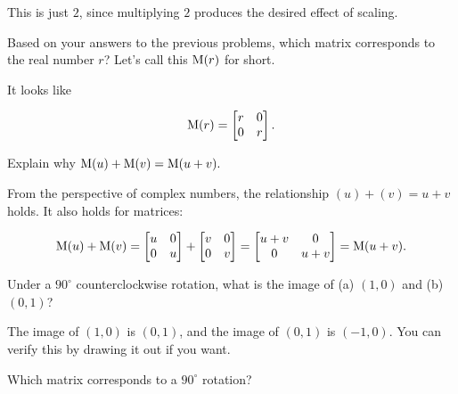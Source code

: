 \documentclass[../gatm_answers.tex]{subfiles}
\begin{document}
This is just $2$, since multiplying $2$ produces the desired effect of scaling.

\begin{outer_problem}
\item Based on your answers to the previous problems, which matrix corresponds to the real number $r$? Let's call this $\operatorname{M} (r)$ for short.
\end{outer_problem}

It looks like

$$\operatorname{M} (r) = \begin{bmatrix} r & 0 \\ 0 & r \end{bmatrix}.$$

\begin{outer_problem}
\item Explain why $\operatorname{M} (u)+\operatorname{M}(v)=\operatorname{M}(u+v).$
\end{outer_problem}

From the perspective of complex numbers, the relationship $(u)+(v)=u+v$ holds. It also holds for matrices:

$$\operatorname{M}(u) + \operatorname{M}(v) = \begin{bmatrix} u & 0 \\ 0 & u \end{bmatrix} + \begin{bmatrix} v & 0 \\ 0 & v \end{bmatrix} = \begin{bmatrix} u+v & 0 \\ 0 & u+v \end{bmatrix} = \operatorname{M}(u+v).$$

\begin{outer_problem}
\item Under a $90^\circ$ counterclockwise rotation, what is the image of (a) $(1,0)$ and (b) $(0,1)$?
\end{outer_problem}

The image of $(1,0)$ is $(0,1)$, and the image of $(0,1)$ is $(-1,0)$. You can verify this by drawing it out if you want.

\begin{outer_problem}
\item \label{prob:pr_end}
\end{outer_problem}

\begin{inner_problem}[start=1]
\item Which matrix corresponds to a $90^\circ$ rotation?
\end{inner_problem}
\end{document}
